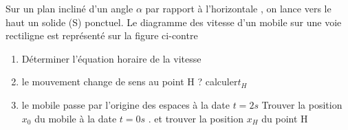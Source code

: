 \documentclass[10pt,a4paper]{article}
\begin{document}
\begin{tcolorbox}[sabour,title=EXERCICE 15]
\begin{minipage}{10cm}
Sur un plan incliné d'un angle $\alpha $ par rapport à l'horizontale , on lance vers le haut un solide (S) ponctuel.
Le diagramme des vitesse d'un mobile sur une voie rectiligne est représenté sur la figure ci-contre 
\begin{enumerate}
\item Déterminer l'équation horaire de la vitesse 
\item le mouvement change de sens au point H ? calculer$t_H$
\item le mobile passe par l'origine des espaces à la date $t=2s$  Trouver la position $x_0$ du mobile à la date $t=0s$ . et trouver la position $x_H$ du point H
\end{enumerate}
\end{minipage}
\begin{minipage}{8cm}
\end{minipage}


\end{tcolorbox}
\end{document}
